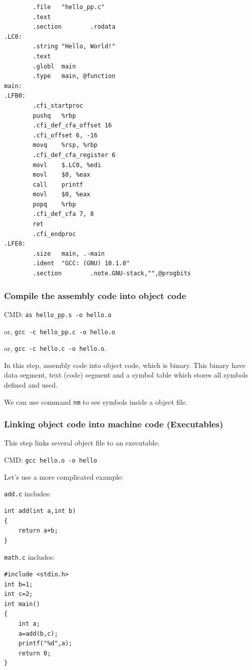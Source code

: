 \documentclass[]{article}
\begin{document}
\begin{verbatim}
        .file   "hello_pp.c"
        .text
        .section        .rodata
.LC0:
        .string "Hello, World!"
        .text
        .globl  main
        .type   main, @function
main:
.LFB0:
        .cfi_startproc
        pushq   %rbp
        .cfi_def_cfa_offset 16
        .cfi_offset 6, -16
        movq    %rsp, %rbp
        .cfi_def_cfa_register 6
        movl    $.LC0, %edi
        movl    $0, %eax
        call    printf
        movl    $0, %eax
        popq    %rbp
        .cfi_def_cfa 7, 8
        ret
        .cfi_endproc
.LFE0:
        .size   main, .-main
        .ident  "GCC: (GNU) 10.1.0"
        .section        .note.GNU-stack,"",@progbits
\end{verbatim}
\subsubsection{Compile the assembly code into object code}

CMD: \verb|as hello_pp.s -o hello.o|

or, \verb|gcc -c hello_pp.c -o hello.o|

or, \verb|gcc -c hello.c -o hello.o|.

In this step, assembly code into object code, which is binary. This binary have data segment, text (code) segment and a symbol table which stores all symbols defined and used.

We can use command \verb|nm| to see symbols inside a object file.

\subsubsection{Linking object code into machine code (Executables)}

This step links several object file to an executable.

CMD: \verb|gcc hello.o -o hello|

Let's use a more complicated example:

\verb|add.c| includes:
\begin{verbatim}
int add(int a,int b)
{
    return a+b;
}
\end{verbatim}

\verb|math.c| includes:
\begin{verbatim}
#include <stdio.h>
int b=1;
int c=2;
int main()
{
    int a;
    a=add(b,c);
    printf("%d",a);
    return 0;
}
\end{verbatim}
\end{document}
